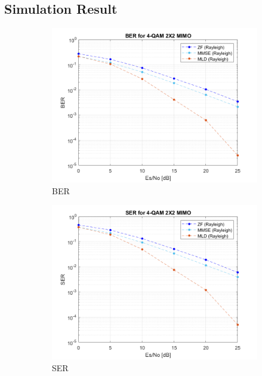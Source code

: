 \documentclass{article}
\begin{document}
\subsection{Simulation Result}
\begin{figure}[H]
	\centering
	\begin{subfigure}{0.5\textwidth}
		\centerline{\includegraphics[width=1\textwidth]{a_Es_BER.png}}
		\caption{BER}
	\end{subfigure}%
	\begin{subfigure}{0.5\textwidth}
		\centerline{\includegraphics[width=1\textwidth]{a_Es_SER.png}}
		\caption{SER}
	\end{subfigure}\\%
	\begin{subfigure}{0.5\textwidth}

\end{subfigure}
\end{figure}
\end{document}
